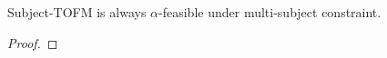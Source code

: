 \documentclass[a4j,10pt]{jsarticle}
\theoremstyle{definition}
\theoremstyle{remark}
\theoremstyle{plain}
\begin{document}
\begin{tcolorbox}
  Subject-TOFM is always $\alpha$-feasible under multi-subject constraint.\\

  \begin{proof}
    
  \end{proof}
\end{tcolorbox}







\end{document}
